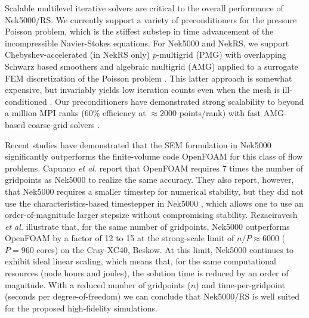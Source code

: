 Scalable multilevel iterative solvers are critical to the overall performance
of Nek5000/RS.   We currently support a variety of preconditioners for the
pressure Poisson problem, which is the stiffest substep in time advancement of
the incompressible Navier-Stokes equations.  For Nek5000 and NekRS, we support
Chebyshev-accelerated (in NekRS only) $p$-multigrid (PMG) with overlapping
Schwarz based smoothers \cite{lottes05,nekrs} and algebraic multigrid (AMG)
applied to a surrogate FEM discretization of the Poisson problem
\cite{pedro19,sao80}.  This latter approach is somewhat expensive, but
invariably yields low iteration counts even when the mesh is ill-conditioned
\cite{fischer97}.  Our preconditioners have demonstrated strong scalability to
beyond a million MPI ranks (60\% efficiency at $\approx 2000$ points/rank) with
fast AMG-based coarse-grid solvers \cite{fischer15}.


Recent studies
have demonstrated that the SEM formulation in Nek5000 significantly outperforms
the finite-volume code OpenFOAM for this class of flow problems.  Capuano {\em
et al.} \cite{palumbo} report that OpenFOAM requires 7 times the number of
gridpoints as Nek5000 to realize the same accuracy.  They also report, however,
that Nek5000 requires a smaller timestep for numerical stability, but they did
not use the characteristics-based timestepper in Nek5000 \cite{patel18},  which
allows one to use an order-of-magnitude larger stepsize without compromising
stability.  Rezaeiravesh {\em et al.} \cite{schlatter21} illustrate that,
for the same number of gridpoints, Nek5000 outperforms OpenFOAM by a factor
of 12 to 15 at the strong-scale limit of $n/P \approx 6000$ ($P=960$ cores) on
the Cray-XC40, Beskow.  At this limit, Nek5000 continues to exhibit ideal linear
scaling, which means that, for the same computational resources (node hours and
joules), the solution time is reduced by an order of magnitude.  With a reduced
number of gridpoints ($n$) and time-per-gridpoint (seconds per
degree-of-freedom) we can conclude that Nek5000/RS is well suited for the
proposed high-fidelity simulations.


